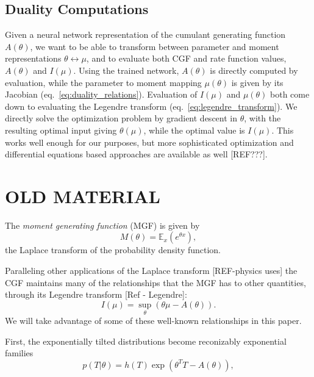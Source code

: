 \documentclass[10pt]{article}      %
\begin{document}
\subsection{Duality Computations}
Given a neural network representation of the cumulant generating function $A(\theta)$, we want to be able to transform between parameter and moment representations $\theta \leftrightarrow \mu$, and to evaluate both CGF and rate function values, $A(\theta)$ and $I(\mu)$.
Using the trained network, $A(\theta)$ is directly computed by evaluation, while the parameter to moment mapping $\mu(\theta)$ is given by its Jacobian (eq.~\ref{eq:duality_relations}).
Evaluation of $I(\mu)$ and $\mu(\theta)$ both come down to evaluating the Legendre transform (eq.~\ref{eq:legendre_transform}). 
We directly solve the optimization problem by gradient descent in $\theta$, with the resulting optimal input giving $\theta(\mu)$, while the optimal value is $I(\mu)$.
This works well enough for our purposes, but more sophisticated optimization and differential equations based approaches are available as well [REF???].



\section{OLD MATERIAL}


The \textit{moment generating function} (MGF) is given by
\begin{equation}
  M(\theta) = \mathbb{E}_x(e^{\theta x}), \label{def:MGF}
\end{equation}
the Laplace transform of the probability density function.



Paralleling other applications of the Laplace transform [REF-physics uses] the CGF maintains many of the relationships that the MGF has to other quantities, through its Legendre transform [Ref - Legendre]:
\begin{equation}
  I(\mu) = \sup_{\theta}( \theta \mu - A(\theta) ). \label{eq:legendre_transform}
\end{equation}
We will take advantage of some of these well-known relationships in this paper.

First, the exponentially tilted distributions become reconizably exponential families
\begin{equation}
  p(T | \theta) = h(T) \exp( \theta^T T - A(\theta) ),
\end{equation}
\end{document}
